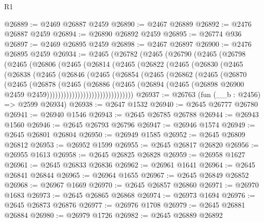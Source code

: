 \begin{lexlean}{R1}
\begin{coremodule}
@26889 := @2469 @26887 @2459
@26890 := @2467 @26889
@26892 := @2476 @26887 @2459
@26894 := @26890 @26892 @2459
@26895 := @26774 @936
@26897 := @2469 @26895 @2459
@26898 := @2467 @26897
@26900 := @2476 @26895 @2459
@26934 := @2465
    (@26782
      (@2465
        (@26790
          (@2465
            (@26798
              (@2465
                (@26806
                  (@2465
                    (@26814
                      (@2465
                        (@26822
                          (@2465
                            (@26830
                              (@2465
                                (@26838
                                  (@2465
                                    (@26846
                                      (@2465
                                        (@26854
                                          (@2465
                                            (@26862
                                              (@2465
                                                (@26870
                                                  (@2465
                                                    (@26878
                                                      (@2465
                                                        (@26886
                                                          (@2465
                                                            (@26894
                                                              (@2465
                                                                (@26898
                                                                  @26900
                                                                  @2459
                                                                  @2459)))))))))))))))))))))))))))))))
@26937 := @26763 (fun (__b : @2456) => @2599 @26934)
@26938 := @2647 @1532
@26940 := @2645 @26777 @26780
@26941 := @26940 @1546
@26943 := @2645 @26785 @26788
@26944 := @26943 @1560
@26946 := @2645 @26793 @26796
@26947 := @26946 @1574
@26949 := @2645 @26801 @26804
@26950 := @26949 @1585
@26952 := @2645 @26809 @26812
@26953 := @26952 @1599
@26955 := @2645 @26817 @26820
@26956 := @26955 @1613
@26958 := @2645 @26825 @26828
@26959 := @26958 @1627
@26961 := @2645 @26833 @26836
@26962 := @26961 @1641
@26964 := @2645 @26841 @26844
@26965 := @26964 @1655
@26967 := @2645 @26849 @26852
@26968 := @26967 @1669
@26970 := @2645 @26857 @26860
@26971 := @26970 @1683
@26973 := @2645 @26865 @26868
@26974 := @26973 @1694
@26976 := @2645 @26873 @26876
@26977 := @26976 @1708
@26979 := @2645 @26881 @26884
@26980 := @26979 @1726
@26982 := @2645 @26889 @26892

\end{coremodule}
\end{lexlean}
